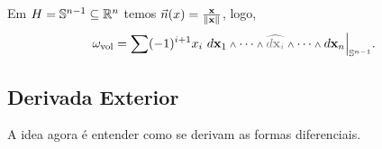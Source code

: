 

\vspace{-1cm}

\begin{example}
    Em \(H = \mathbb{S}^{n-1}\subseteq \mathbb{R}^n\) temos \(\vec{n}(x) = \frac{\textbf{x}}{\|\textbf{x}\|}\), logo, 
    \[\omega_\text{vol} = \sum (-1)^{i+1} x_i \ d\x_1 \wedge \cdots \wedge \textcolor{gray}{\widehat{d\x_i}} \wedge \cdots \wedge d\x_n\Big|_{\E^{n-1}}.\]
\end{example}


\subsection{Derivada Exterior}

\begin{note}
    A idea agora é entender como se derivam as formas diferenciais. 
\end{note}

